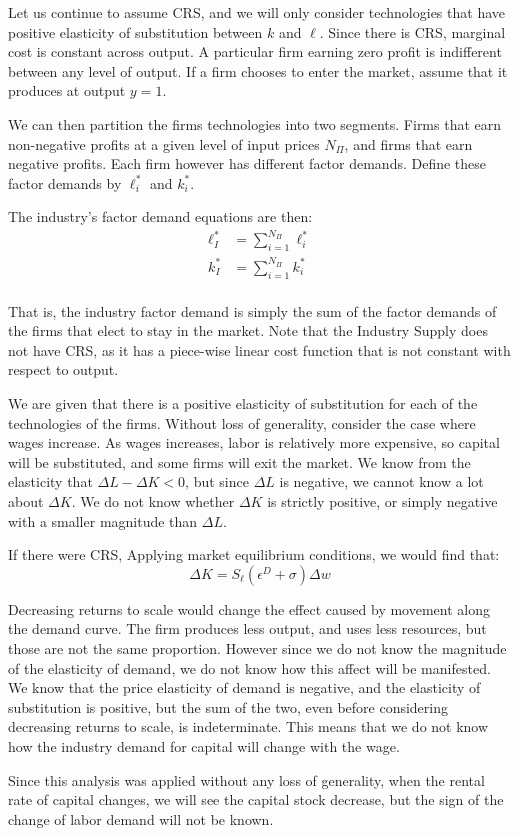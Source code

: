 \documentclass[12pt]{paper}
\begin{document}
Let us continue to assume CRS, and we will only consider technologies
that have positive elasticity of substitution between $k$ and $\ell$. Since there is CRS,
marginal cost is constant across output. A particular firm earning
zero profit is indifferent between any level of output. If a firm
chooses to enter the market, assume that it produces at output $y=1$.

We can then partition the firms technologies into two segments. Firms
that earn non-negative profits at a given level of input prices $N_{\Pi}$, and
firms that earn negative profits. Each firm however has different
factor demands. Define these factor demands by $\ell_i^{*}$ and
$k_i^{*}$.

The industry's factor demand equations are then:
\begin{align*}
  \ell_I^{*} &= \sum_{i = 1}^{N_{\Pi}} \ell_i^{*}\\
  k_I^{*} &= \sum_{i=1}^{N_{\Pi}} k_i^{*}\\
\end{align*}

That is, the industry factor demand is simply the sum of the factor
demands of the firms that elect to stay in the market. Note that the
Industry Supply does not have CRS, as it has a piece-wise linear cost
function that is not constant with respect to output.

We are given that there is a positive elasticity of substitution for each
of the technologies of the firms. Without loss of generality, consider the case where wages increase. As wages increases, labor is relatively more
expensive, so capital will be substituted, and some firms will exit
the market. We know from the elasticity that $\Delta L - \Delta K < 0$, but
since $\Delta L $ is negative, we cannot know a lot about $\Delta K$. We do not know whether $\Delta K$ is strictly
positive, or simply negative with a smaller magnitude than $\Delta L$. 

If there were CRS, Applying market equilibrium conditions, we would find that:
\begin{equation*}
  \Delta K = S_\ell \left( \epsilon^D + \sigma \right)\Delta w
\end{equation*}

Decreasing returns to scale would change the effect caused by movement
along the demand curve. The firm produces less output, and uses less
resources, but those are not the same proportion. However since we do
not know the magnitude of the elasticity of demand, we do not know how
this affect will be manifested. We know that the price elasticity of
demand is negative, and the elasticity of substitution is positive,
but the sum of the two, even before considering decreasing returns to
scale, is indeterminate. This means that we do not know how the
industry demand for capital will change with the wage.


Since this analysis was applied without any loss of generality, when
the rental rate of capital changes, we will see the capital stock
decrease, but the sign of the change of labor demand will not be
known. 
\end{document}
